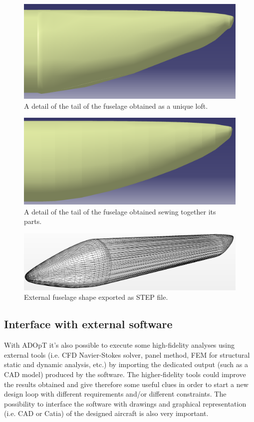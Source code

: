 \begin{figure}[H]
	\centering
		\includegraphics[width=6 cm]{Immagini/gui/CADfuselageTailBAD2.png}
		\caption{A detail of the tail of the fuselage obtained as a unique loft.}
		\label{fig:badTail}
	\end{figure}
	
	\begin{figure}[H]
	\centering
		\includegraphics[width=6 cm]{Immagini/gui/CADfuselageTailOK.png}
		\caption{A detail of the tail of the fuselage obtained sewing together its parts.}
		\label{fig:goodTail}
\end{figure}


	\begin{figure}[H]
	\centering
		\includegraphics[width=12 cm]{Immagini/gui/CADfuselage}
		\caption{External fuselage shape exported as STEP file.}
		\label{fig:goodTail}
\end{figure}


\subsection{Interface with external software}
With ADOpT it's also possible to execute some high-fidelity analyses using external tools (i.e. CFD Navier-Stokes solver, panel method, FEM for structural static and dynamic analysis, etc.) by importing the dedicated output (such as a CAD model) produced by the software. The higher-fidelity tools could improve the results obtained and give therefore some useful clues in order to start a new design loop with different requirements and/or different constraints. The possibility to interface the software with drawings and graphical representation (i.e. CAD or Catia) of the designed aircraft is also very important.

